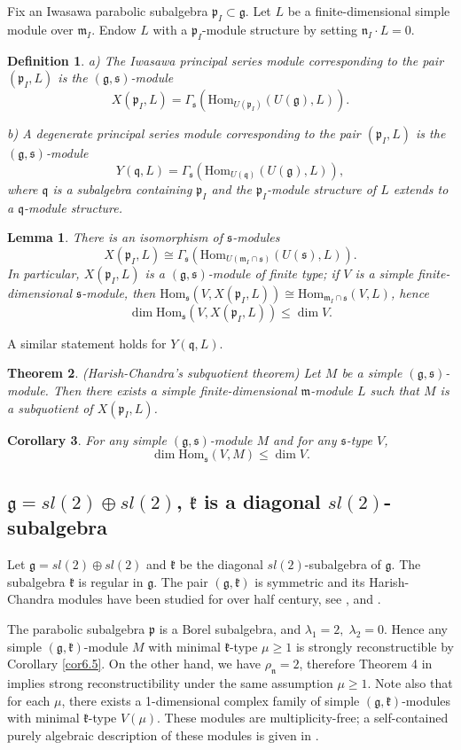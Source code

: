 \documentclass[11pt]{amsart}
\newcounter{theorem}
\newtheorem{theo}{Theorem}[section]
\newtheorem{lemma}[theo]{Lemma}
\newtheorem{corollary}[theo]{Corollary}
\newtheorem{defi}{Definition}[section]
\renewcommand{\ss}{\mathfrak{s}}
\newcommand{\kk}{\mathfrak{k}}
\newcommand{\nn}{\mathfrak{n}}
\newcommand{\mm}{\mathfrak{m}}
\newcommand{\qq}{\mathfrak{q}}
\newcommand{\pp}{\mathfrak{p}}
\renewcommand{\gg}{\mathfrak{g}}
\newcommand{\refcor}[1]{Corollary \ref{#1}}
\newcommand{\Hom}{\mathrm{Hom}}
\begin{document}
Fix an Iwasawa parabolic subalgebra $\pp_I\subset\gg$. Let $L$ be a finite-dimensional simple module over $\mm_I$. Endow $L$ with a $\pp_I$-module structure by setting $\nn_I\cdot L=0$.
\begin{defi}
a) The \textit{Iwasawa principal series module corresponding to the pair} $(\pp_I,L)$ is the $(\gg,\ss)$-module $$X(\pp_I,L)=\Gamma_\ss(\Hom_{U(\pp_I)}(U(\gg),L)).$$

b) A degenerate principal series module corresponding to the pair $(\pp_I,L)$ is the $(\gg,\ss)$-module $$Y(\qq,L)=\Gamma_\ss(\Hom_{U(\qq)}(U(\gg),L)),$$ where $\qq$ is a subalgebra containing $\pp_I$ and the $\pp_I$-module structure of $L$ extends to a $\qq$-module structure.
\end{defi}
\begin{lemma}
There is an isomorphism of $\ss$-modules $$X(\pp_I,L)\cong\Gamma_\ss(\Hom_{U(\mm_I\cap\ss)}(U(\ss),L)).$$ In particular, $X(\pp_I,L)$ is a $(\gg,\ss)$-module of finite type; if $V$ is a simple finite-dimensional $\ss$-module, then $\Hom_\ss(V,X(\pp_I,L))\cong\Hom_{\mm_I\cap\ss}(V,L)$, hence $$\dim\Hom_\ss(V,X(\pp_I,L))\leq\dim V.$$
\end{lemma}
A similar statement holds for $Y(\qq,L)$.
\begin{theo}
(Harish-Chandra's subquotient theorem)
Let $M$ be a simple $(\gg,\ss)$-module. Then there exists a simple finite-dimensional $\mm$-module $L$ such that $M$ is a subquotient of $X(\pp_I,L)$.
\end{theo}
\begin{corollary}
For any simple $(\gg,\ss)$-module $M$ and for any $\ss$-type $V$, $$\dim\Hom_\ss(V,M)\leq\dim V.$$
\end{corollary}

\subsection{$\gg=sl(2)\oplus sl(2)$, $\kk$ is a diagonal $sl(2)$-subalgebra} %

Let $\gg= sl(2)\oplus sl(2)$ and $\kk$ be the diagonal $sl(2)$-subalgebra of $\gg$. The subalgebra $\kk$ is regular in $\gg$. The pair $(\gg,\kk)$ is symmetric and its Harish-Chandra modules have been studied for over half century, see \cite{GN}, \cite{B} and \cite{HC}.

The parabolic subalgebra $\pp$ is a Borel subalgebra, and $\lambda_1=2,\;\lambda_2=0$. Hence any simple $(\gg,\kk)$-module $M$ with minimal $\kk$-type $\mu\geq 1$ is strongly reconstructible by \refcor{cor6.5}.  On the other hand, we have $\rho_{\nn}=2$, therefore Theorem 4 in \cite{PZ2} implies strong reconstructibility under the same assumption $\mu\geq 1$. Note also that for each $\mu$, there exists a 1-dimensional complex family of simple $(\gg,\kk)$-modules with minimal $\kk$-type $V(\mu)$. These modules are multiplicity-free; a self-contained purely algebraic description of these modules is given in \cite{PS2}.
\end{document}

